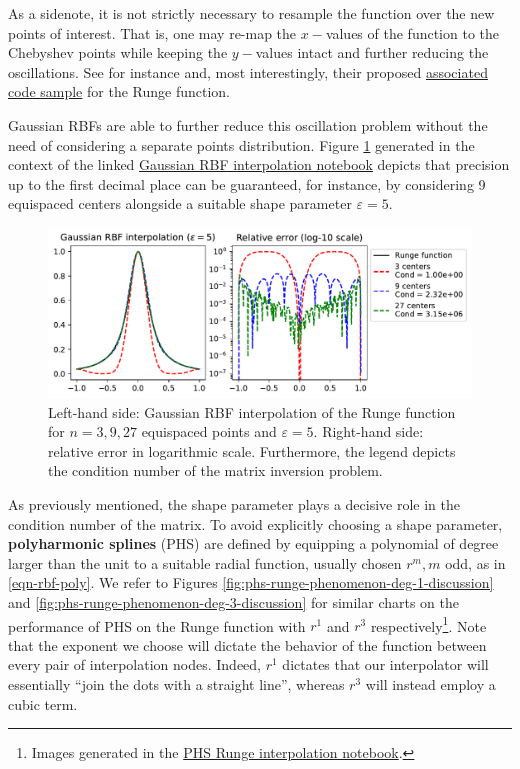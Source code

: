 \documentclass[12pt]{report} %
\begin{document}
As a sidenote,
it is not strictly necessary to resample the function over the new points of interest. That is, one may re-map the $x-$values of the function to the Chebyshev points while keeping the $y-$values intact and further reducing the oscillations. See for instance \cite{DEMARCHI2021125628} and, most interestingly, their proposed \href{https://github.com/pog87/FakeNodes/blob/master/Runge.ipynb}{associated code sample} for the Runge function.

Gaussian RBFs are able to further reduce this oscillation problem without the need of considering a separate points distribution. Figure \ref{fig:rbf-runge-phenomenon-eps-5-discussion} generated in the context of the linked \href{https://github.com/heqro/tfm-experiments/blob/main/introductory_notebooks/rbf_interpolation/runge_rbf.ipynb}{Gaussian RBF interpolation notebook} depicts that precision up to the first decimal place can be guaranteed, for instance, by considering 9 equispaced centers alongside a suitable shape parameter $\varepsilon=5$.

\begin{figure}[ht]
  \centering
  \includegraphics[width=\textwidth]{imagenes/rbf_interpolation/rbf_runge_5.pdf}
  \caption{Left-hand side: Gaussian RBF interpolation of the Runge function for $n=3,9,27$ equispaced points and $\varepsilon=5$. Right-hand side: relative error in logarithmic scale. Furthermore, the legend depicts the condition number of the matrix inversion problem.}
  \label{fig:rbf-runge-phenomenon-eps-5-discussion}
\end{figure}

As previously mentioned, the shape parameter plays a decisive role in the condition number of the matrix.
To avoid explicitly choosing a shape parameter, \textbf{polyharmonic splines} (PHS) are defined by equipping a polynomial of degree larger than the unit to a suitable radial function, usually chosen $r^m,m$ odd, as in \eqref{eqn-rbf-poly}. We refer to Figures \ref{fig:phs-runge-phenomenon-deg-1-discussion} and \ref{fig:phs-runge-phenomenon-deg-3-discussion} for similar charts on the performance of PHS on the Runge function with $r^1$ and $r^3$ respectively\footnote{Images generated in the \href{https://github.com/heqro/tfm-experiments/blob/main/introductory_notebooks/rbf_interpolation/runge_phs.ipynb}{PHS Runge interpolation notebook}.}. Note that the exponent we choose will dictate the behavior of the function between every pair of interpolation nodes. Indeed, $r^1$ dictates that our interpolator will essentially ``join the dots with a straight line'', whereas $r^3$ will instead employ a cubic term.
\end{document}
